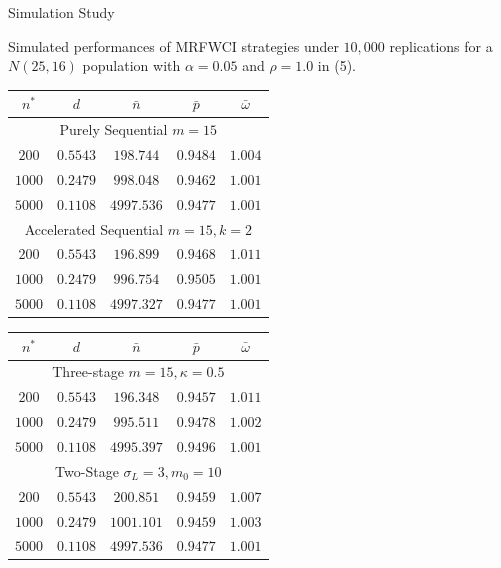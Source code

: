 \documentclass [xcolor=svgnames, t] {beamer}
\begin{document}
\begin{frame}{Simulation Study}

Simulated performances of  MRFWCI strategies under $10,000$ replications for a 
$N(25,16)$ population with $\alpha=0.05$ and $\rho=1.0$ in (5).
 \begin{center}
\begin{tabular}{c c c c c} 
 \hline
 $n^*$ & $d$ & $\bar{n}$ & $\bar{p}$ & $\bar{\omega}$\\
 \hline
 \multicolumn{5}{c}{Purely Sequential $m=15$}\\
  \hline
 $200$ & $0.5543$ & $198.744$ & $0.9484$  & $1.004$\\ 
 $1000$ & $0.2479$ & $998.048$ & $0.9462$ & $1.001$ \\ 
  $5000$ & $0.1108$ & $4997.536$ & $0.9477$ & $1.001$ \\ 
  \hline
 \multicolumn{5}{c}{Accelerated Sequential $m=15,k=2$}\\
 \hline
 $200$ & $0.5543$ & $196.899$ & $0.9468$ & $1.011$ \\ 
 $1000$ & $0.2479$ & $996.754$ & $0.9505$  & $1.001$\\ 
  $5000$ & $0.1108$ & $4997.327$ & $0.9477$  & $1.001$\\ 
 \hline
\end{tabular}
\end{center}
    
\end{frame}
\begin{frame}{}
    \vspace{10mm}
 \begin{center}
\begin{tabular}{c c c c c} 
 \hline
 $n^*$ & $d$ & $\bar{n}$ & $\bar{p}$ & $\bar{\omega}$\\
 \hline
 \multicolumn{5}{c}{Three-stage $m=15,\kappa=0.5$}\\
  \hline
 $200$ & $0.5543$ & $196.348$ & $0.9457$  & $1.011$\\ 
 $1000$ & $0.2479$ & $995.511$ & $0.9478$ & $1.002$ \\ 
  $5000$ & $0.1108$ & $4995.397$ & $0.9496$ & $1.001$ \\ 
  \hline
\multicolumn{5}{c}{Two-Stage $\sigma_L=3, m_0=10$}\\
 \hline
 $200$ & $0.5543$ & $200.851$ & $0.9459$ & $1.007$ \\ 
 $1000$ & $0.2479$ & $1001.101$ & $0.9459$  & $1.003$\\ 
  $5000$ & $0.1108$ & $4997.536$ & $0.9477$  & $1.001$\\ 
 \hline
\end{tabular}
\end{center}
    
\end{frame}
\end{document}
